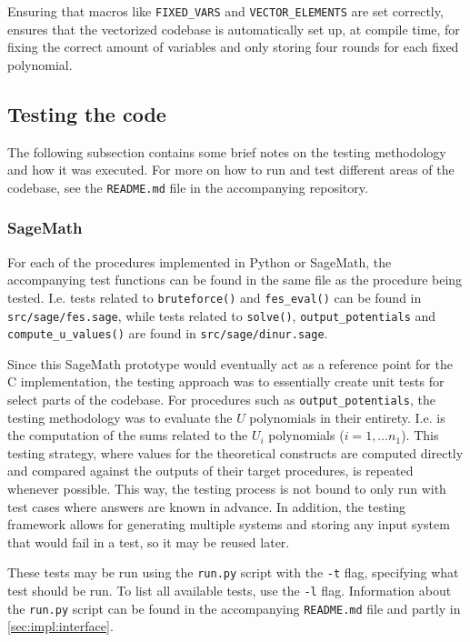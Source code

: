 Ensuring that macros like \texttt{FIXED\_VARS} and \texttt{VECTOR\_ELEMENTS} are set correctly, ensures that the vectorized codebase is automatically set up, at compile time, for fixing the correct amount of variables and only storing four rounds for each fixed polynomial.

\subsection{Testing the code}
The following subsection contains some brief notes on the testing methodology and how it was executed. For more on how to run and test different areas of the codebase, see the \texttt{README.md} file in the accompanying repository.

\subsubsection{SageMath}

For each of the procedures implemented in Python or SageMath, the accompanying test functions can be found in the same file as the procedure being tested. I.e. tests related to \texttt{bruteforce()} and \texttt{fes\_eval()} can be found in \texttt{src/sage/fes.sage}, while tests related to \texttt{solve()}, \texttt{output\_potentials} and \texttt{compute\_u\_values()} are found in \texttt{src/sage/dinur.sage}.

Since this SageMath prototype would eventually act as a reference point for the C implementation, the testing approach was to essentially create unit tests for select parts of the codebase. For procedures such as \texttt{output\_potentials}, the testing methodology was to evaluate the $U$ polynomials in their entirety. I.e.
is the computation of the sums related to the $U_i$ polynomials ($i = 1, \dots n_1$). This testing strategy, where values for the theoretical constructs are computed directly and compared against the outputs of their target procedures, is repeated whenever possible. This way, the testing process is not bound to only run with test cases where answers are known in advance. In addition, the testing framework allows for generating multiple systems and storing any input system that would fail in a test, so it may be reused later.

These tests may be run using the \texttt{run.py} script with the \texttt{-t} flag, specifying what test should be run. To list all available tests, use the \texttt{-l} flag. Information about the \texttt{run.py} script can be found in the accompanying \texttt{README.md} file and partly in \cref{sec:impl:interface}.

